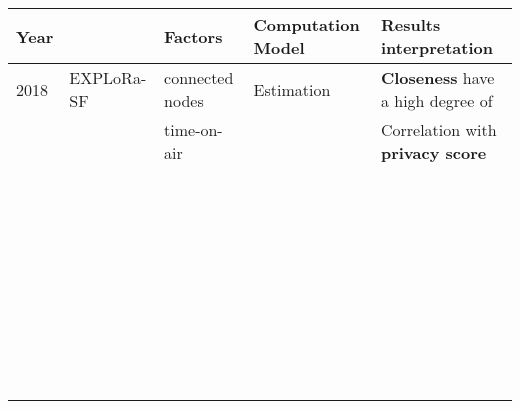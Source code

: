 \begin{longtable}{lllll}
	Year  & \                                              & \textbf{Factors}           & \textbf{Computation Model}             & \textbf{Results interpretation}                               \\\hline
	2018  & EXPLoRa-SF \cite{cuomo_explora_2017}           & connected nodes            & Estimation                             & \textbf{Closeness} have a high degree of                      \\
	\     &                                                & time-on-air                &                                        & Correlation with \textbf{privacy score}                       \\\hline
	\     &                                                &                               &                                        &                                                               \\
	\     &                                                &                               &                                        &                                                               \\
	\     &                                                &                               &                                        &                                                               \\
	\     &                                                &                               &                                        &                                                               \\
	\     &                                                &                               &                                        &                                                               \\
	\     &                                                &                               &                                        &                                                               \\
	\     &                                                &                               &                                        &                                                               \\
	\     &                                                &                               &                                        &                                                               \\

\end{longtable}
